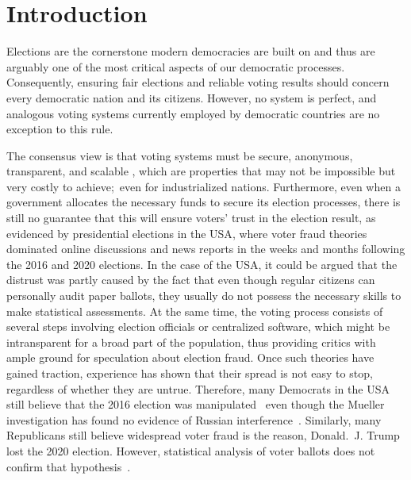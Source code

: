 \chapter{Introduction}\label{ch:intro}

Elections are the cornerstone modern democracies are built on and thus are arguably one of the most critical aspects of our democratic processes.
Consequently, ensuring fair elections and reliable voting results should concern every democratic nation and its citizens.
However, no system is perfect, and analogous voting systems currently employed by democratic countries are no exception to this rule.

The consensus view is that voting systems must be secure, anonymous, transparent, and scalable
\autocites[9-11]{jafar_blockchain_2021}[3]{diaz-santiso_e-voting_2021}{lowry_desirable_2009}[10-12]{tas_systematic_2020},
which are properties that may not be impossible but very costly to achieve;\ even for industrialized nations.
Furthermore, even when a government allocates the necessary funds to secure its election processes, there is still no
guarantee that this will ensure voters’ trust in the election result, as evidenced by presidential elections in the \Gls{USA}, where voter fraud theories dominated online discussions and news reports in the weeks and months following the 2016 and 2020 elections.
In the case of the \Gls{USA}, it could be argued that the distrust was partly caused by the fact that even though regular citizens can personally audit paper ballots, they usually do not possess the necessary skills to make statistical assessments.
At the same time, the voting process consists of several steps involving election officials or centralized software, which might be intransparent for a broad part of the population, thus providing critics with ample ground for speculation about election fraud.
Once such theories have gained traction, experience has shown that their spread is not easy to stop, regardless of whether they are untrue.
Therefore, many Democrats in the \Gls{USA} still believe that the 2016 election was manipulated~\autocite{sinclair_its_2018}
even though the Mueller investigation has found no evidence of Russian interference~\autocite{mueller_report_2019}.
Similarly, many Republicans still believe widespread voter fraud is the reason, Donald.\ J. Trump lost the 2020 election.
However, statistical analysis of voter ballots does not confirm that hypothesis~\autocite{eggers_no_2021}.

